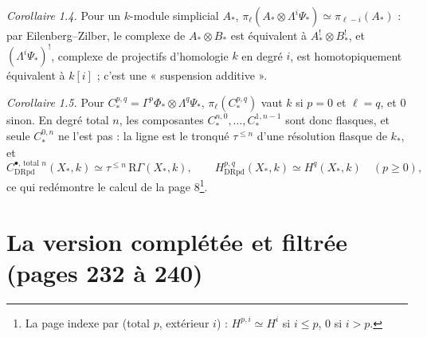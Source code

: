 \documentclass[11pt,a4paper]{article}
\begin{document}
\emph{Corollaire 1.4.} Pour un $k$-module simplicial $A_*$, $\pi_\ell(A_*
\otimes \Lambda^i\Psi_*) \simeq \pi_{\ell-i}(A_*)$ : par Eilenberg–Zilber, le
complexe de $A_* \otimes B_*$ est équivalent à $A^!_* \otimes B^!_*$, et
$(\Lambda^i\Psi_*)^!$, complexe de projectifs d'homologie $k$ en degré $i$, est
homotopiquement équivalent à $k[i]$ ; c'est une « suspension additive ».

\emph{Corollaire 1.5.} Pour $C^{p,q}_* = \Gamma^p\Phi_* \otimes \Lambda^q
\Psi_*$, $\pi_\ell(C^{p,q}_*)$ vaut $k$ si $p = 0$ et $\ell = q$, et $0$ sinon.
En degré total $n$, les composantes $C^{n,0}_*, \ldots, C^{1,n-1}_*$ sont donc
flasques, et seule $C^{0,n}_*$ ne l'est pas : la ligne est le tronqué $\tau^{\leq
n}$ d'une résolution flasque de $k_*$, et
\[
C^{\bullet,\, \text{total } n}_{\mathrm{DRpd}}(X_*, k) \simeq \tau^{\leq n}\,\mathrm{R}\Gamma(X_*, k) , \qquad H^{p,q}_{\mathrm{DRpd}}(X_*, k) \simeq H^q(X_*, k) \quad (p \geq 0) ,
\]
ce qui redémontre le calcul de la page 8\footnote{La page indexe par (total
$p$, extérieur $i$) : $H^{p,i} \simeq H^i$ si $i \leq p$, $0$ si $i > p$.}.

\section*{La version complétée et filtrée (pages 232 à 240)}
\end{document}
